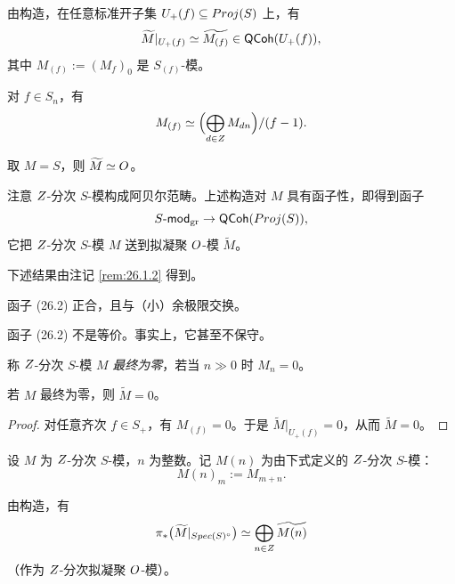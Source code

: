 \begin{remark}\label{rem:26.1.2}
由构造，在任意标准开子集 $U_+(f) \subseteq Proj(S)$ 上，有
\[
\widetilde{M}|_{U_+(f)} \simeq \widetilde{M_{(f)}} \in \mathsf{QCoh}(U_+(f)),
\]
其中 $M_{(f)} := (M_f)_0$ 是 $S_{(f)}$-模。

对 $f \in S_n$，有
\[
M_{(f)} \simeq \Bigl(\bigoplus_{d \in Z} M_{dn}\Bigr)/(f-1).
\]
\end{remark}

\begin{example}\label{ex:26.1.3}
取 $M = S$，则 $\widetilde{M} \simeq O$。
\end{example}

注意 $Z$-分次 $S$-模构成阿贝尔范畴。上述构造对 $M$ 具有函子性，即得到函子
\begin{equation}\label{eq:26.2}
S\text{-}\mathsf{mod}_{\mathrm{gr}} \to \mathsf{QCoh}(Proj(S)),
\end{equation}
它把 $Z$-分次 $S$-模 $M$ 送到拟凝聚 $O$-模 $\widetilde{M}$。

下述结果由注记 \ref{rem:26.1.2} 得到。

\begin{lemma}\label{lem:26.1.4}
函子 (26.2) 正合，且与（小）余极限交换。
\end{lemma}

\begin{warning}\label{warn:26.1.5}
函子 (26.2) 不是等价。事实上，它甚至不保守。
\end{warning}

\begin{definition}\label{def:26.1.6}
称 $Z$-分次 $S$-模 $M$ \emph{最终为零}，若当 $n \gg 0$ 时 $M_n = 0$。
\end{definition}

\begin{lemma}\label{lem:26.1.7}
若 $M$ 最终为零，则 $\widetilde{M} = 0$。
\end{lemma}

\begin{proof}
对任意齐次 $f \in S_+$，有 $M_{(f)} = 0$。于是 $\widetilde{M}|_{U_+(f)} = 0$，从而 $\widetilde{M} = 0$。
\end{proof}

\begin{notation}\label{not:26.1.8}
设 $M$ 为 $Z$-分次 $S$-模，$n$ 为整数。记 $M(n)$ 为由下式定义的 $Z$-分次 $S$-模：
\[
M(n)_m := M_{m+n}.
\]
\end{notation}

\begin{remark}\label{rem:26.1.9}
由构造，有
\[
\pi_*\bigl(\widetilde{M}|_{Spec(S)^{\circ}}\bigr) \simeq \bigoplus_{n \in Z} \widetilde{M(n)}
\]
（作为 $Z$-分次拟凝聚 $O$-模）。
\end{remark}


